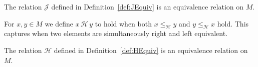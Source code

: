 \begin{lemma}
\label{lem:JEquiv-isEquivalence}
The relation \(\mathcal J\) defined in Definition~\ref{def:JEquiv} is an equivalence relation on \(M\).
\leanok
{}
\end{lemma}

\begin{definition}[H equivalence]
\label{def:HEquiv}
For \(x,y\in M\) we define \(x \,\mathcal H\, y\) to hold when both \(x \le_{\mathcal H} y\) and \(y \le_{\mathcal H} x\) hold.  This captures when two elements are simultaneously right and left equivalent.
\leanok
\end{definition}

\begin{lemma}
\label{lem:HEquiv-isEquivalence}
The relation \(\mathcal H\) defined in Definition~\ref{def:HEquiv} is an equivalence relation on \(M\).
\leanok
{}
\end{lemma}
